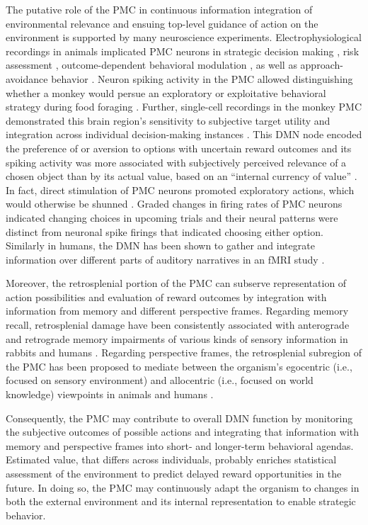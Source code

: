 \documentclass[10pt,letterpaper]{article}
\begin{document}
The putative role of the PMC in continuous information integration of
environmental relevance
and ensuing top-level guidance of action on the environment is supported
by many neuroscience experiments.
Electrophysiological recordings in animals implicated PMC neurons in
strategic decision making \citep{pearson2009neurons},
risk assessment \citep{mccoy2005risk},
outcome-dependent behavioral modulation \citep{hayden2009electrophysiological},
as well as approach-avoidance behavior
\citep{vann2009does}.
Neuron spiking activity in the PMC allowed distinguishing
whether a monkey would persue an exploratory or exploitative
behavioral strategy during food foraging \citep{pearson2009neurons}.
Further, single-cell recordings in the monkey PMC
demonstrated this brain region's sensitivity to
subjective target utility \citep{mccoy2005risk} and integration
across individual decision-making instances \citep{pearson2009neurons}.
This DMN node encoded the
preference of or aversion to options with uncertain reward outcomes
and its spiking activity was more associated with
subjectively perceived relevance of a chosen object
than by its actual value,
based on an ``internal currency of value'' \citep{mccoy2005risk}.
In fact, direct stimulation of PMC neurons
promoted exploratory actions,
which would otherwise be shunned \citep{hayden2008stim}.
Graded changes in firing rates of PMC neurons
indicated changing choices in upcoming trials and their neural patterns were
distinct from neuronal spike firings that indicated choosing either option.
Similarly in humans,
the DMN has been shown to gather and integrate information
over different parts of auditory narratives in an fMRI study
\citep{simony2016dynamic}.


Moreover, the retrosplenial portion of the PMC can subserve
representation of action possibilities
and evaluation of reward outcomes by integration with
information from memory and different perspective frames.
Regarding memory recall, retrosplenial damage have been
consistently associated with anterograde and retrograde memory impairments
of various kinds of sensory information
in rabbits and humans
\citep{vann2009does}.
Regarding perspective frames, the retrosplenial subregion of the PMC has been
proposed to mediate between the organism's egocentric
(i.e., focused on sensory environment) and
allocentric (i.e., focused on world knowledge) viewpoints
in animals and humans
\citep{epstein2008parahippocampal, burgess2008spatial, valiquette2007different}.



Consequently, the PMC may contribute to overall DMN function
by monitoring the subjective outcomes
of possible actions and integrating that information
with memory and perspective frames
into short- and longer-term behavioral agendas.
Estimated value, that differs across individuals, probably enriches
statistical assessment of the environment
to predict delayed reward opportunities in the future.
In doing so, the PMC may continuously adapt the organism to changes
in both the external environment and its internal representation
to enable strategic behavior.
\end{document}
